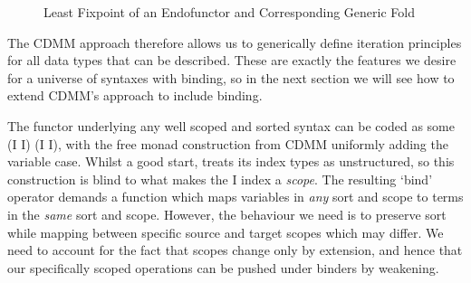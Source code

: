 \begin{figure}[h]
\caption{Least Fixpoint of an Endofunctor and Corresponding Generic Fold}\label{figure:datamu}
\end{figure}

The CDMM approach therefore allows us to generically define iteration principles
for all data types that can be described. These are exactly the features we desire
for a universe of syntaxes with binding, so in the next section we will see how
to extend CDMM's approach to include binding.

The functor underlying any well scoped and sorted syntax can be coded as some
{ (I \AR{$\times$}  I) (I \AR{$\times$}  I)}, with the
free monad construction from CDMM uniformly adding the variable case. Whilst a
good start,  treats its index types as unstructured, so this construction
is blind to what makes the { I} index a \emph{scope}. The resulting
`bind' operator demands a function which maps variables in \emph{any} sort and
scope to terms in the \emph{same} sort and scope. However, the behaviour we need
is to preserve sort while mapping between specific source and target scopes which
may differ. We need to account for the fact that scopes change only by extension,
and hence that our specifically scoped operations can be pushed under binders by
weakening.
